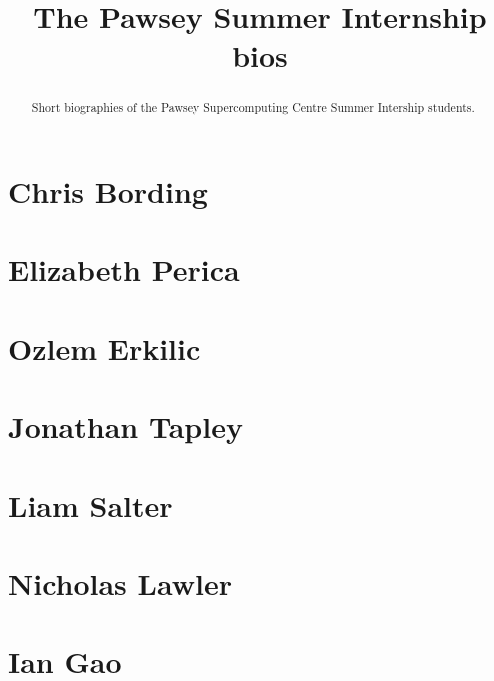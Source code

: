 \documentclass[11pt,a4paper]{report}
\title{The Pawsey Summer Internship bios}
\begin{document}
\maketitle
\tableofcontents


\begin{abstract}

Short biographies of the Pawsey Supercomputing Centre Summer Intership students.

\end{abstract}

\chapter{Chris Bording}


\chapter{Elizabeth Perica}


\chapter{Ozlem Erkilic}


\chapter{Jonathan Tapley}


\chapter{Liam Salter}


\chapter{Nicholas Lawler}



\chapter{Ian Gao}

\end{document}
